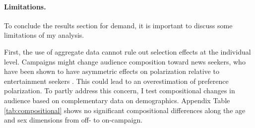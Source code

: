 \documentclass[12pt]{article}
\begin{document}

\FloatBarrier

\paragraph{Limitations.}

To conclude the results section for demand, it is important to discuss some limitations of my analysis. 

First, the use of aggregate data cannot rule out selection effects at the individual level. Campaigns might change audience composition toward news seekers, who have been shown to have asymmetric effects on polarization relative to entertainment seekers \citep{levendusky,arceneaux_johnson_2013}. This could lead to an overestimation of preference polarization. To partly address this concern, I test compositional changes in audience based on complementary data on demographics. Appendix Table \ref{tab:compositional} shows no significant compositional differences along the age and sex dimensions from off- to on-campaign. 
\end{document}
